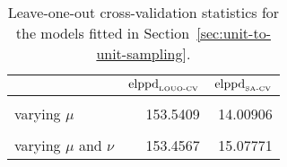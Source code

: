 \begin{table}
\centering
\caption{\label{tab:elppd_loo}Leave-one-out cross-validation statistics for the models fitted in Section~\ref{sec:unit-to-unit-sampling}.}
\centering
\begin{tabular}[t]{lrr}
\toprule
  & $\hbox{elppd}_{\hbox{\tiny{LOUO-CV}}}$ & $\hbox{elppd}_{\hbox{\tiny{SA-CV}}}$\\
\midrule
\cellcolor{gray!10}{complete pooling} & \cellcolor{gray!10}{154.3189} & \cellcolor{gray!10}{15.17704}\\
varying $\mu$ & 153.5409 & 14.00906\\
\cellcolor{gray!10}{varying $\nu$} & \cellcolor{gray!10}{153.2858} & \cellcolor{gray!10}{15.12410}\\
varying $\mu$ and $\nu$ & 153.4567 & 15.07771\\
\bottomrule
\end{tabular}
\end{table}
